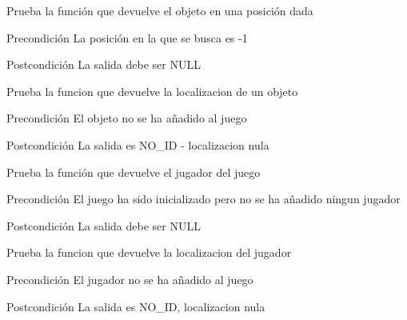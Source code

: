 \begin{DoxyRefList}
\item[\label{test__test000093}%
\hypertarget{test__test000093}{}%
Global \hyperlink{game__test_8c_aaaa3f443ced9be8af9f15856ca61f9be}{test2\-\_\-game\-\_\-get\-\_\-object\-\_\-at} ()]Prueba la función que devuelve el objeto en una posición dada \begin{DoxyPrecond}{Precondición}
La posición en la que se busca es -\/1 
\end{DoxyPrecond}
\begin{DoxyPostcond}{Postcondición}
La salida debe ser N\-U\-L\-L  
\end{DoxyPostcond}

\item[\label{test__test000109}%
\hypertarget{test__test000109}{}%
Global \hyperlink{game__test_8c_a635a940244bbb00d432a6accee598c20}{test2\-\_\-game\-\_\-get\-\_\-object\-\_\-location} ()]Prueba la funcion que devuelve la localizacion de un objeto \begin{DoxyPrecond}{Precondición}
El objeto no se ha añadido al juego 
\end{DoxyPrecond}
\begin{DoxyPostcond}{Postcondición}
La salida es N\-O\-\_\-\-I\-D -\/ localizacion nula  
\end{DoxyPostcond}

\item[\label{test__test000098}%
\hypertarget{test__test000098}{}%
Global \hyperlink{game__test_8c_a8a8b3634c39499b44a9211f8f1bf06ba}{test2\-\_\-game\-\_\-get\-\_\-player} ()]Prueba la función que devuelve el jugador del juego \begin{DoxyPrecond}{Precondición}
El juego ha sido inicializado pero no se ha añadido ningun jugador 
\end{DoxyPrecond}
\begin{DoxyPostcond}{Postcondición}
La salida debe ser N\-U\-L\-L  
\end{DoxyPostcond}

\item[\label{test__test000107}%
\hypertarget{test__test000107}{}%
Global \hyperlink{game__test_8c_a113c52a92fc38e3baa9b6c5e97179a51}{test2\-\_\-game\-\_\-get\-\_\-player\-\_\-location} ()]Prueba la funcion que devuelve la localizacion del jugador \begin{DoxyPrecond}{Precondición}
El jugador no se ha añadido al juego 
\end{DoxyPrecond}
\begin{DoxyPostcond}{Postcondición}
La salida es N\-O\-\_\-\-I\-D, localizacion nula  
\end{DoxyPostcond}


\end{DoxyRefList}
